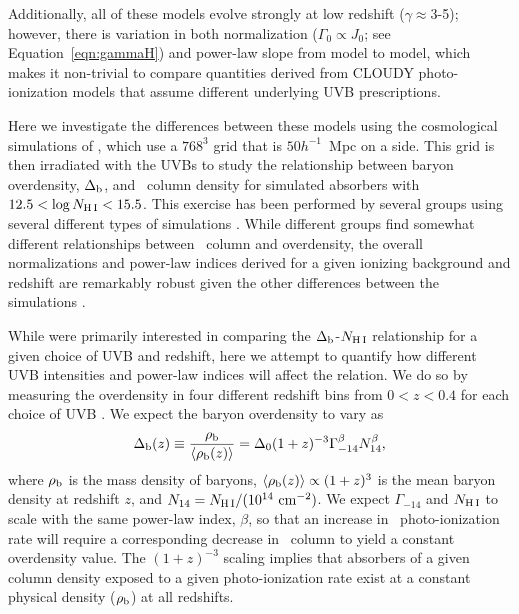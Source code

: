 \documentclass[twocolumn,twocolappendix,tighten,times]{aastex6}
\newcommand{\HI}{\ion{H}{1}}
\begin{document}
Additionally, all of these models evolve strongly at low redshift 
($\gamma\approx3$-5); however, there is variation in both normalization 
($\Gamma_0 \propto J_0$; see Equation~\ref{eqn:gammaH}) and power-law slope from 
model to model, which makes it non-trivial to compare quantities derived from 
CLOUDY photo-ionization models that assume different underlying UVB prescriptions.

Here we investigate the differences between these models using the cosmological 
simulations of \citet{shull15}, which use a $768^3$ grid that is $50h^{-1}$~Mpc 
on a side. This grid is then irradiated with the \citet{haardt01,haardt05,haardt12}
UVBs to study the relationship between baryon overdensity, $\Delta_{\rm b}$, and 
\HI\ column density for simulated absorbers with $12.5<\log{N_{\rm H\,I}}<15.5$. 
This exercise has been performed by several groups using several different types 
of simulations \citep{dave10,tepper-garcia12,shull15}. While different groups find 
somewhat different relationships between \HI\ column and overdensity, the overall 
normalizations and power-law indices derived for a given ionizing background and 
redshift  are remarkably robust given the other differences between the 
simulations \citep[see discussion in][]{shull15}. 

While \citet{shull15} were primarily interested in comparing the 
$\Delta_{\rm b}$-$N_{\rm H\,I}$ relationship for a given choice of UVB and 
redshift, here we attempt to quantify how different UVB intensities and 
power-law indices will affect the relation. We do so by measuring the 
overdensity in four different redshift bins from $0<z<0.4$ for each 
choice of UVB \citep{haardt01,haardt05,haardt12}. We expect the baryon 
overdensity to vary as
\begin{equation}
\Delta_{\rm b}(z) \equiv \frac{\rho_{\rm b}}{\langle\rho_{\rm b}(z)\rangle} = \Delta_0 (1+z)^{-3} \Gamma_{-14}^{\beta} N_{14}^{\beta},
\end{equation}
where $\rho_{\rm b}$ is the mass density of baryons, 
$\langle\rho_{\rm b}(z)\rangle \propto (1+z)^3$ is the mean baryon density at 
redshift $z$, and $N_{14} = N_{\rm H\,I}/(10^{14}~{\rm cm}^{-2})$. We expect 
$\Gamma_{-14}$ and $N_{\rm H\,I}$ to scale with the same power-law index, $\beta$, 
so that an increase in \HI\ photo-ionization rate will require a corresponding 
decrease in \HI\ column to yield a constant overdensity value. The $(1+z)^{-3}$ 
scaling implies that absorbers of a given column density exposed to a given 
photo-ionization rate exist at a constant physical density ($\rho_{\rm b}$) at 
all redshifts. 
\end{document}
